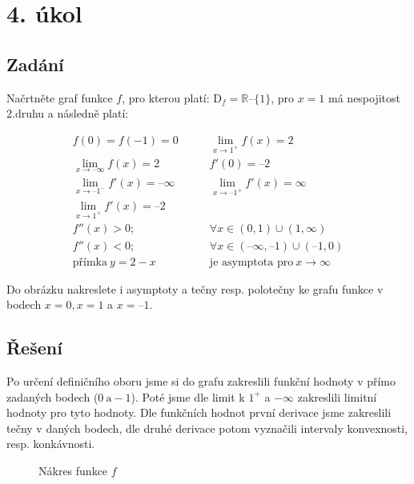 \section{4. úkol}
\subsection{Zadání}
Načrtněte graf funkce $f$,
pro kterou platí: $\text{D}_{f} = \mathbb{R} – \{1\}$, pro $x = 1$ má nespojitost 2.druhu a následně platí:

\begin{align*}
f(0) = f(-1) = 0&\qquad \lim_{x\rightarrow 1^{+}} f(x) = 2\\
\lim_{x\rightarrow –\infty} f(x) = 2&\qquad f'(0) = –2\\
\lim_{x\rightarrow –1^{-}} f'(x) = – \infty&\qquad \lim_{x\rightarrow –1^{+}} f'(x) = \infty\\
\lim_{x\rightarrow 1^{+}} f'(x) = – 2&\\
f''(x) > 0;&\qquad\forall x \in (0, 1) \cup (1, \infty)\\
f''(x) < 0;&\qquad\forall x \in (–\infty, –1) \cup (–1,0)\\
\text{přímka}\ y = 2 - x &\qquad\text{je asymptota pro}\ x\rightarrow \infty
\end{align*}

Do obrázku nakreslete i asymptoty a tečny resp. polotečny ke grafu funkce v bodech $x = 0, x = 1$ a $x = –1$.

\subsection{Řešení}
Po určení definičního oboru jsme si do grafu zakreslili funkční hodnoty v přímo zadaných bodech ($0\ \text{a} -1$). Poté jsme dle limit k $1^+$ a $-\infty$ zakreslili limitní hodnoty pro tyto hodnoty. Dle funkčních hodnot první derivace jsme zakreslili tečny v daných bodech, dle druhé derivace potom vyznačili intervaly konvexnosti, resp. konkávnosti.

\begin{figure}[H]
	\centering
	
	\caption{Nákres funkce $f$}
\end{figure}

